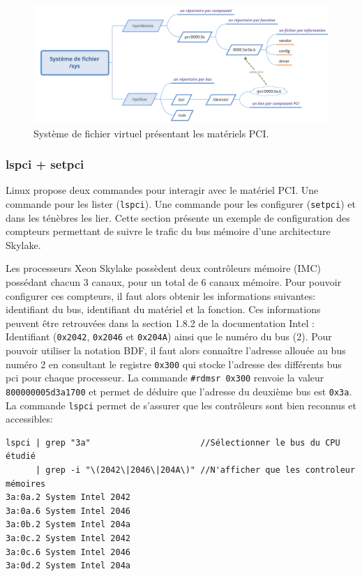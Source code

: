     
        \begin{figure}
        \center
        \includegraphics[width=16cm]{images/edl_perf_sys_pci.png}
        \caption{\label{fig:edl_perf_sys_pci} Système de fichier virtuel présentant les matériels PCI.}
        \end{figure}

    
    \subsubsection{lspci + setpci}\label{annexe:hc_lspci}
    
        Linux propose deux commandes pour interagir avec le matériel PCI. Une commande pour les lister (\verb|lspci|). Une commande pour les configurer (\verb|setpci|) et dans les ténèbres les lier. Cette section présente un exemple de configuration des compteurs permettant de suivre le trafic du bus mémoire d'une architecture Skylake. 
        
        
        
        Les processeurs Xeon Skylake possèdent deux contrôleurs mémoire (IMC) possédant chacun 3 canaux, pour un total de 6 canaux mémoire. Pour pouvoir configurer ces compteurs, il faut alors obtenir les informations suivantes: identifiant du bus, identifiant du matériel et la fonction. Ces informations peuvent être retrouvées dans la section 1.8.2 de la documentation Intel \cite{Intel2017b}: Identifiant (\verb|0x2042|, \verb|0x2046| et \verb|0x204A|) ainsi que le numéro du bus (2). Pour pouvoir utiliser la notation BDF, il faut alors connaître l'adresse allouée au bus numéro 2 en consultant le registre \verb|0x300| qui stocke l'adresse des différents bus pci pour chaque processeur. La commande \verb|#rdmsr 0x300| renvoie la valeur \verb|800000005d3a1700| et permet de déduire que l'adresse du deuxième bus est \verb|0x3a|. La commande \verb|lspci| permet de s'assurer que les contrôleurs sont bien reconnus et accessibles:
\begin{verbatim}
lspci | grep "3a"                      //Sélectionner le bus du CPU étudié
      | grep -i "\(2042\|2046\|204A\)" //N'afficher que les controleur mémoires
3a:0a.2 System Intel 2042 
3a:0a.6 System Intel 2046 
3a:0b.2 System Intel 204a 
3a:0c.2 System Intel 2042
3a:0c.6 System Intel 2046 
3a:0d.2 System Intel 204a
\end{verbatim}
    

